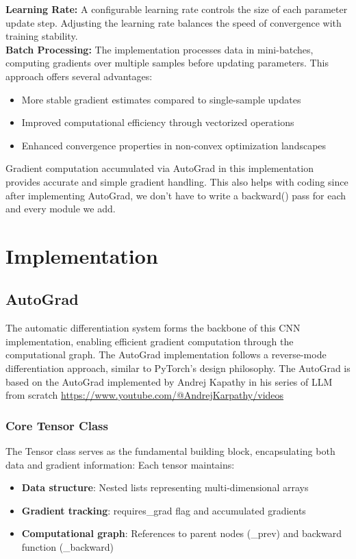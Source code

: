 \documentclass[conference]{IEEEtran}
\begin{document}
\textbf{Learning Rate:} A configurable learning rate controls the size of each parameter update step. Adjusting the learning rate balances the speed of convergence with training stability.\\

\textbf{Batch Processing:} The implementation processes data in mini-batches, computing gradients over multiple samples before updating parameters. This approach offers several advantages:
\begin{itemize}
    \item More stable gradient estimates compared to single-sample updates
    \item Improved computational efficiency through vectorized operations
    \item Enhanced convergence properties in non-convex optimization landscapes
\end{itemize}

\noindent Gradient computation accumulated via AutoGrad in this implementation provides accurate and simple gradient handling. This also helps with coding since after implementing AutoGrad, we don't have to write a backward() pass for each and every module we add.

\section{Implementation}
\subsection{AutoGrad}
The automatic differentiation system forms the backbone of this CNN implementation, enabling efficient gradient computation through the computational graph. The AutoGrad implementation follows a reverse-mode differentiation approach, similar to PyTorch's design philosophy. The AutoGrad is based on the AutoGrad implemented by Andrej Kapathy in his series of LLM from scratch \url{https://www.youtube.com/@AndrejKarpathy/videos}

\subsubsection{Core Tensor Class}
The Tensor class serves as the fundamental building block, encapsulating both data and gradient information:
Each tensor maintains:
\begin{itemize}
\item \textbf{Data structure}: Nested lists representing multi-dimensional arrays
\item \textbf{Gradient tracking}: requires\_grad flag and accumulated gradients
\item \textbf{Computational graph}: References to parent nodes (\_prev) and backward function (\_backward)
\end{itemize}
\end{document}
